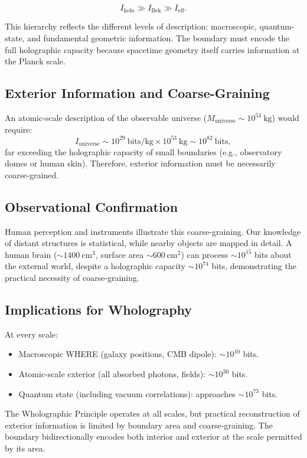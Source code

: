 ﻿\documentclass[12pt]{article}
\begin{document}
\[
I_{\mathrm{holo}} \gg I_{\mathrm{Bek}} \gg I_{\mathrm{eff}}.
\]


This hierarchy reflects the different levels of description: macroscopic, quantum-state, and fundamental geometric information. The boundary must encode the full holographic capacity because spacetime geometry itself carries information at the Planck scale.


\subsection{Exterior Information and Coarse-Graining}


An atomic-scale description of the observable universe ($M_{\mathrm{universe}} \sim 10^{53}~\mathrm{kg}$) would require:
\[
I_{\mathrm{universe}} \sim 10^{29}~\text{bits/kg} \times 10^{53}~\mathrm{kg} \sim 10^{82}~\text{bits},
\]
far exceeding the holographic capacity of small boundaries (e.g., observatory domes or human skin). Therefore, exterior information must be necessarily coarse-grained.


\subsection{Observational Confirmation}


Human perception and instruments illustrate this coarse-graining. Our knowledge of distant structures is statistical, while nearby objects are mapped in detail. A human brain ($\sim 1400~\mathrm{cm^3}$, surface area $\sim 600~\mathrm{cm^2}$) can process $\sim 10^{15}$ bits about the external world, despite a holographic capacity $\sim 10^{74}$ bits, demonstrating the practical necessity of coarse-graining.


\subsection{Implications for Wholography}


At every scale:
\begin{itemize}
    \item Macroscopic WHERE (galaxy positions, CMB dipole): $\sim 10^{10}$ bits.
    \item Atomic-scale exterior (all absorbed photons, fields): $\sim 10^{30}$ bits.
    \item Quantum state (including vacuum correlations): approaches $\sim 10^{73}$ bits.
\end{itemize}


The Wholographic Principle operates at all scales, but practical reconstruction of exterior information is limited by boundary area and coarse-graining. The boundary bidirectionally encodes both interior and exterior at the scale permitted by its area.
\end{document}
